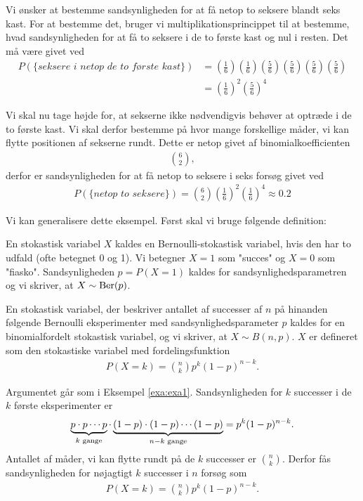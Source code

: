 \begin{exa}\label{exa:exa1}
Vi ønsker at bestemme sandsynligheden for at få netop to seksere blandt seks kast. For at bestemme det, bruger vi multiplikationsprincippet til at bestemme, hvad sandsynligheden for at få to seksere i de to første kast og nul i resten. Det må være givet ved
\begin{align*}
P(\{\textit{seksere i netop de to første kast}\}) &= \left( \frac{1}{6}\right)\left( \frac{1}{6}\right)\left( \frac{5}{6}\right)\left( \frac{5}{6}\right)\left( \frac{5}{6}\right)\left( \frac{5}{6}\right) \\
&= \left( \frac{1}{6}\right)^2\left( \frac{5}{6}\right)^4
\end{align*}

Vi skal nu tage højde for, at sekserne ikke nødvendigvis behøver at optræde i de to første kast. Vi skal derfor bestemme på hvor mange forskellige måder, vi kan flytte positionen af sekserne rundt. Dette er netop givet af binomialkoefficienten 
\begin{align*}
\binom{6}{2},
\end{align*}
derfor er sandsynligheden for at få netop to seksere i seks forsøg givet ved
\begin{align*}
P(\{\textit{netop to seksere}\}) = \binom{6}{2}\left(\frac{1}{6}\right)^2\left(\frac{1}{6}\right)^4 \approx 0.2
\end{align*}
\end{exa}
Vi kan generalisere dette eksempel. Først skal vi bruge følgende definition:
\begin{defn}
En stokastisk variabel $X$ kaldes en Bernoulli-stokastisk variabel, hvis den har to udfald (ofte betegnet $0$ og 1). Vi betegner $X=1$ som "succes" og $X=0$ som "fiasko". Sandsynligheden $p= P(X=1)$ kaldes for sandsynlighedsparametren og vi skriver, at $X \sim \textnormal{Ber}(p)$. 
\end{defn}
\begin{defn}
En stokastisk variabel, der beskriver antallet af successer af $n$ på hinanden følgende Bernoulli eksperimenter med sandsynlighedsparameter $p$ kaldes for en binomialfordelt stokastisk variabel, og vi skriver, at $X \sim B(n,p)$. $X$ er defineret som den stokastiske variabel med fordelingsfunktion
\begin{align*}
P(X=k) = \binom{n}{k}p^k(1-p)^{n-k}.
\end{align*}
\end{defn}
Argumentet går som i Eksempel \ref{exa:exa1}. Sandsynligheden for $k$ successer i de $k$ første eksperimenter er
\begin{align*}
 \underbrace{p\cdot p \cdots p}_{k\textnormal{ gange}}\cdot \underbrace{(1-p)\cdot (1-p)\cdots (1-p)}_{n-k\textnormal{ gange}}=p^k(1-p)^{n-k}.
\end{align*}
Antallet af måder, vi kan flytte rundt på de $k$ successer er $\binom{n}{k}$. Derfor fås sandsynligheden for nøjagtigt $k$ successer i $n$ forsøg som 
\begin{align*}
P(X=k) = \binom{n}{k}p^k(1-p)^{n-k}.
\end{align*}

